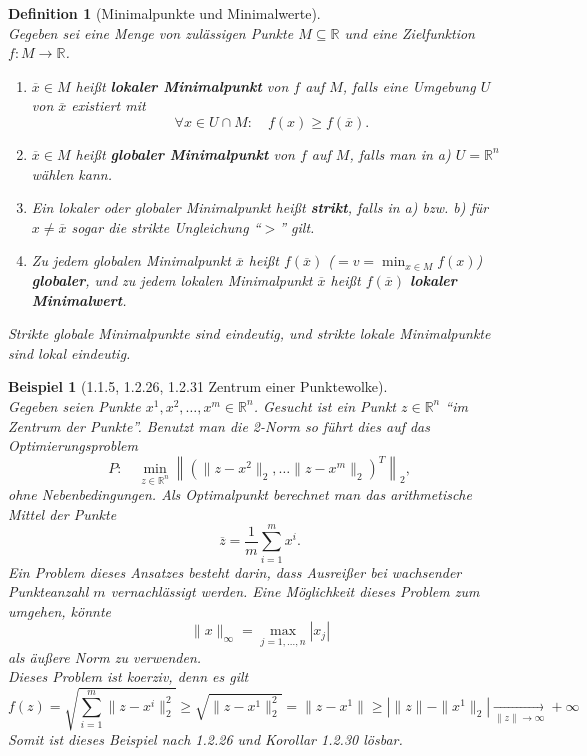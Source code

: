 \documentclass[12pt]{extreport} %
\newcommand{\R}{\mathbb{R}}
\theoremstyle{named}
\theoremstyle{nnamed}
\theoremstyle{itshape}
\newtheorem*{definition}{Definition}
\theoremstyle{normal}
\newtheorem*{beispiel}{Beispiel}
\begin{document}
\begin{definition}[Minimalpunkte und Minimalwerte] ~\\
	Gegeben sei eine Menge von zulässigen Punkte $M \subseteq \R$ und eine Zielfunktion $f \colon M \rightarrow \R$.
	\begin{enumerate}
		\item $\overline{x} \in M$ heißt \textbf{lokaler Minimalpunkt} von $f$ auf $M$, falls eine Umgebung $U$ von $\overline{x}$  existiert mit
			$$ \forall x \in U \cap M: \quad f(x) \geq f(\overline{x}). $$
		\item $\overline{x} \in M$ heißt \textbf{globaler Minimalpunkt} von $f$ auf $M$, falls man in a) $U = \R^n$ wählen kann.
		\item Ein lokaler oder globaler Minimalpunkt heißt \textbf{strikt}, falls in a) bzw. b) für $x \neq \overline{x}$ sogar die strikte Ungleichung \enquote{$>$} gilt.
		\item Zu jedem globalen Minimalpunkt $\overline{x}$ heißt $f(\overline{x})$ ($= v = \min_{x \in M} f(x)$) \textbf{globaler}, und zu jedem lokalen Minimalpunkt $\overline{x}$ heißt $f(\overline{x})$ \textbf{lokaler Minimalwert}.
	\end{enumerate}
	Strikte globale Minimalpunkte sind eindeutig, und strikte lokale Minimalpunkte sind lokal eindeutig.
\end{definition}

\begin{beispiel}[1.1.5, 1.2.26, 1.2.31 Zentrum einer Punktewolke] ~\\
	Gegeben seien Punkte $x^1, x^2, \dotsc, x^m \in \R^n$. Gesucht ist ein Punkt $z \in \R^n$ \enquote{im Zentrum der Punkte}. Benutzt man die 2-Norm so führt dies auf das Optimierungsproblem
		$$ P: \quad \min_{z \in \R^n} \left\| \left( \| z - x^2 \|_2, \dotsc \| z - x^m \|_2 \right)^T \right\|_2, $$
	ohne Nebenbedingungen. Als Optimalpunkt berechnet man das arithmetische Mittel der Punkte
	$$ \overline{z} = \frac{1}{m} \sum_{i=1}^m x^i. $$
	Ein Problem dieses Ansatzes besteht darin, dass Ausreißer bei wachsender Punkteanzahl $m$ vernachlässigt werden. Eine Möglichkeit dieses Problem zum umgehen, könnte 
	$$ \| x \|_\infty = \max_{j=1, \dotsc, n} |x_j| $$ 
	als äußere Norm zu verwenden. ~\\
	
	Dieses Problem ist koerziv, denn es gilt
	$$ f(z) = \sqrt{\sum_{i=1}^m \| z - x^i \|_2^2} \geq \sqrt{\| z - x^1 \|_2^2} = \| z - x^1 \| \geq \left| \| z \| - \| x^1 \|_2 \right| \xrightarrow[\| z\|\rightarrow \infty]{} +\infty $$
	Somit ist dieses Beispiel nach 1.2.26 und Korollar 1.2.30 lösbar.
\end{beispiel}
\end{document}
